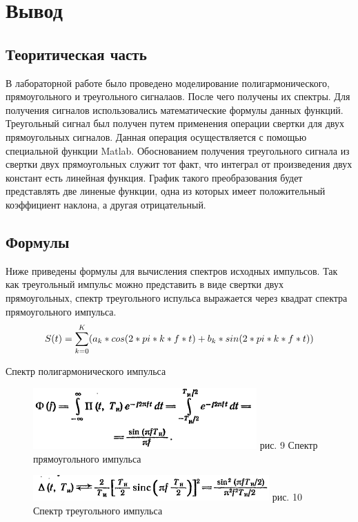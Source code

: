 \documentclass[10pt,a4paper]{report}
\begin{document}
\chapter{Вывод}
\section{Теоритическая часть}
В лабораторной работе было проведено моделирование полигармонического, прямоугольного и треугольного сигналаов. После чего получены их спектры. Для получения сигналов использовались математические формулы данных функций. Треугольный сигнал был получен путем применения операции свертки для двух прямоугольных сигналов. Данная операция осуществляется с помощью специальной функции Matlab.\newline
Обоснованием получения треугольного сигнала из свертки двух прямоугольных служит тот факт, что интеграл от произведения двух констант есть линейная функция. График такого преобразования будет представлять две линеные функции, одна из которых имеет положительный коэффициент наклона, а другая отрицательный.
\section{Формулы}
Ниже приведены формулы для вычисления спектров исходных импульсов. Так как треугольный импульс можно представить в виде свертки двух прямоугольных, спектр треугольного испульса выражается через квадрат спектра прямоугольного импульса. 
\begin{displaymath}
S(t)=\sum \limits_{k=0}^{K}(a_{k}*cos(2*pi*k*f*t)+b_{k}*sin(2*pi*k*f*t))\newline
\end{displaymath}
\begin{center}
Спектр полигармонического импульса
\newline
\end{center}
\begin{figure}
\begin{center}
\includegraphics[angle=0, scale = 1.0]{8.png}\newline
рис. 9    Спектр прямоугольного импульса\newline
\end{center}
\end{figure}
\begin{figure}
\begin{center}
\includegraphics[angle=0, scale = 1.0]{9.png}\newline
рис. 10  Спектр треугольного импульса
\end{center}
\end{figure}
\end{document}
